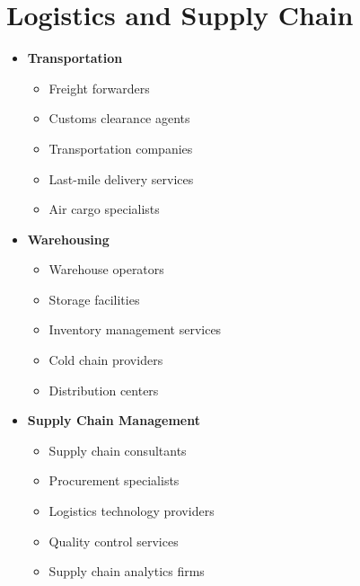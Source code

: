 \section{Logistics and Supply Chain}\label{sec:logistics-supply-chain}
\vspace{1em}

\begin{tcolorbox}[
    colback=white,
    colframe=primarydark,
    title=\textbf{Logistics Service Providers},
    before skip=1em,
    after skip=1em
]
    \begin{itemize}[leftmargin=*,itemsep=0.5em]
        \item \textbf{Transportation}
        \begin{itemize}[itemsep=0.3em]
            \item Freight forwarders
            \item Customs clearance agents
            \item Transportation companies
            \item Last-mile delivery services
            \item Air cargo specialists
        \end{itemize}

        \vspace{0.5em}

        \item \textbf{Warehousing}
        \begin{itemize}[itemsep=0.3em]
            \item Warehouse operators
            \item Storage facilities
            \item Inventory management services
            \item Cold chain providers
            \item Distribution centers
        \end{itemize}

        \vspace{0.5em}

        \item \textbf{Supply Chain Management}
        \begin{itemize}[itemsep=0.3em]
            \item Supply chain consultants
            \item Procurement specialists
            \item Logistics technology providers
            \item Quality control services
            \item Supply chain analytics firms
        \end{itemize}
    \end{itemize}
\end{tcolorbox}

